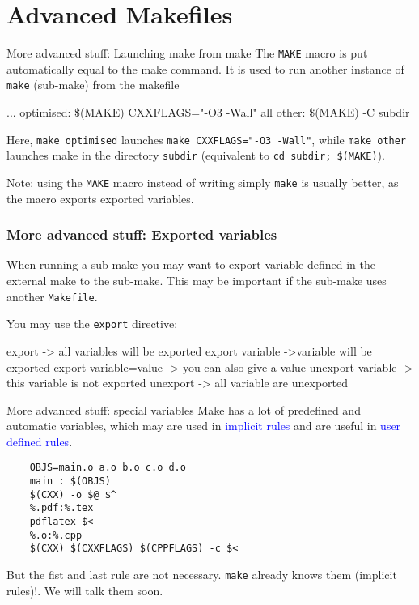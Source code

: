 \documentclass[10pt,aspectratio=169]{beamer}
\newcommand{\blue}{\color{blue}}
\begin{document}
\section*{Advanced Makefiles}
\begin{frame}{More advanced stuff: Launching make from make}
The \texttt{MAKE} macro is put automatically equal to the make command. It is used to run
another instance of \texttt{make} (sub-make) from the makefile
\vspace*{-.3cm}
\begin{semiverbatim}
...\newline
optimised:\newline
\phantom{xx} \$(MAKE) CXXFLAGS="-O3 -Wall" all\newline
other:\newline
\phantom{xx} \$(MAKE) -C subdir
\end{semiverbatim}

Here, \texttt{make optimised} launches \texttt{make CXXFLAGS="-O3
  -Wall"}, while \texttt{make other} launches make in the directory \texttt{subdir} (equivalent to \texttt{cd subdir; \$(MAKE)}).

Note: using the \texttt{MAKE} macro instead of writing simply
\texttt{make} is usually better, as the macro exports exported variables.
\end{frame}

\begin{frame}[fragile]
  \frametitle{More advanced stuff: Exported variables}

  When running a sub-make you may want to export variable defined in the
  external make to the sub-make. This may be important if the
  sub-make uses another \texttt{Makefile}.

You may use the  \texttt{export} directive:
\begin{semiverbatim}
export  -> all variables will be exported
export variable ->variable will be exported
export variable=value -> you can also give a value
unexport variable -> this variable is not exported
unexport -> all variable are unexported
\end{semiverbatim}

\end{frame}


\begin{frame}[fragile]{More advanced stuff: special variables}
    Make has a lot of \alert{predefined} and \alert{automatic variables}, which may are used
    in \textcolor{blue}{implicit rules} and are useful in
    \textcolor{blue}{user defined rules}. 
    \begin{verbatim}
    OBJS=main.o a.o b.o c.o d.o
    main : $(OBJS)
    $(CXX) -o $@ $^
    %.pdf:%.tex
    pdflatex $<
    %.o:%.cpp
    $(CXX) $(CXXFLAGS) $(CPPFLAGS) -c $<
    \end{verbatim}
    
    But the fist and last rule are {\blue not necessary}. \texttt{make} already knows them (\alert{implicit rules})!. We will talk them soon.
\end{frame}
\end{document}
